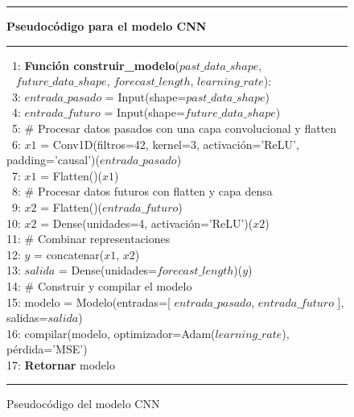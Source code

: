 \begin{figure}[H]
{\small
\hrule
{\bf\small Pseudocódigo para el modelo CNN}
\hrule
\begin{center}
\begin{tabbing}
\ 1: {\bf Fun}\={\bf ción construir\_modelo}($past\_data\_shape$, \\
\  \> $future\_data\_shape$, $forecast\_length$, $learning\_rate$): \\
\ 3: \> $entrada\_pasado$ = Input(shape=$past\_data\_shape$) \\
\ 4: \> $entrada\_futuro$ = Input(shape=$future\_data\_shape$) \\
\ 5: \> \# Procesar datos pasados con una capa convolucional y flatten \\
\ 6: \> $x1$ = Conv1D(filtros=42, kernel=3, activación='ReLU', padding='causal')($entrada\_pasado$) \\
\ 7: \> $x1$ = Flatten()($x1$) \\
\ 8: \> \# Procesar datos futuros con flatten y capa densa \\
\ 9: \> $x2$ = Flatten()($entrada\_futuro$) \\
10: \> $x2$ = Dense(unidades=4, activación='ReLU')($x2$) \\
11: \> \# Combinar representaciones \\
12: \> $y$ = concatenar($x1$, $x2$) \\
13: \> $salida$ = Dense(unidades=$forecast\_length$)($y$) \\
14: \> \# Construir y compilar el modelo \\
15: \> modelo = Modelo(entradas=[ $entrada\_pasado$, $entrada\_futuro$ ], salidas=$salida$) \\
16: \> compilar(modelo, optimizador=Adam($learning\_rate$), pérdida='MSE') \\
17: \> {\bf Retornar} modelo \\
\end{tabbing}
\end{center}
}
\hrule
\caption{Pseudocódigo del modelo CNN}
\label{cnn_model}
\end{figure}


